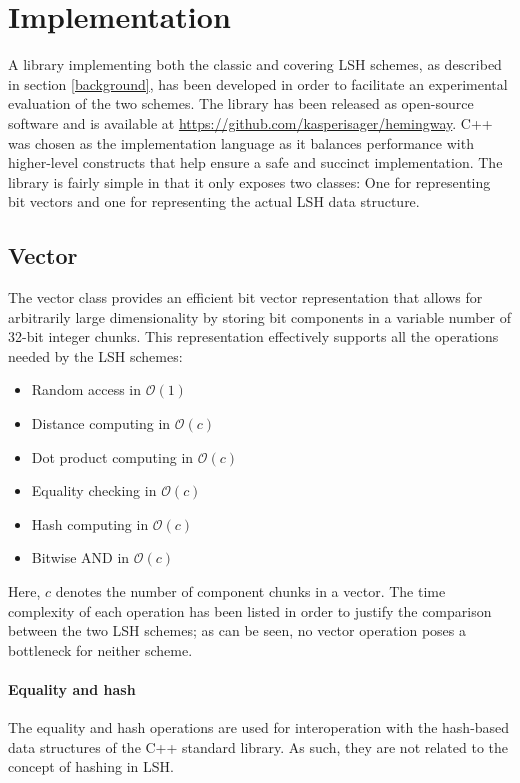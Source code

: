 \section{Implementation}
\label{implementation}

A library implementing both the classic and covering LSH schemes, as described in section \ref{background}, has been developed in order to facilitate an experimental evaluation of the two schemes. The library has been released as open-source software and is available at \url{https://github.com/kasperisager/hemingway}. C++ was chosen as the implementation language as it balances performance with higher-level constructs that help ensure a safe and succinct implementation. The library is fairly simple in that it only exposes two classes: One for representing bit vectors and one for representing the actual LSH data structure.

\subsection{Vector}

The vector class provides an efficient bit vector representation that allows for arbitrarily large dimensionality by storing bit components in a variable number of 32-bit integer chunks. This representation effectively supports all the operations needed by the LSH schemes:

\begin{itemize}
  \item Random access in $\mathcal{O}(1)$
  \item Distance computing in $\mathcal{O}(c)$
  \item Dot product computing in $\mathcal{O}(c)$
  \item Equality checking in $\mathcal{O}(c)$
  \item Hash computing in $\mathcal{O}(c)$
  \item Bitwise AND in $\mathcal{O}(c)$
\end{itemize}

Here, $c$ denotes the number of component chunks in a vector. The time complexity of each operation has been listed in order to justify the comparison between the two LSH schemes; as can be seen, no vector operation poses a bottleneck for neither scheme.

\paragraph{Equality and hash} The equality and hash operations are used for interoperation with the hash-based data structures of the C++ standard library. As such, they are not related to the concept of hashing in LSH.

